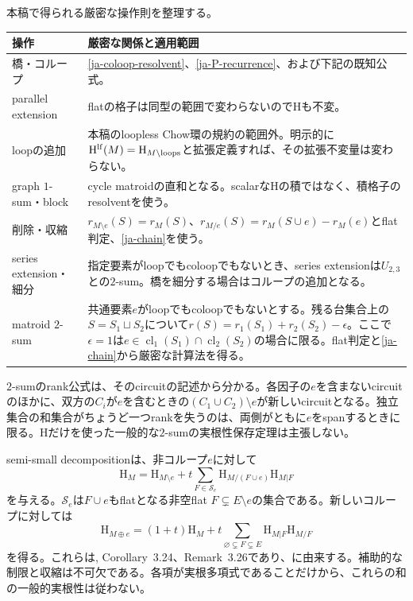 \documentclass[12pt]{amsart}
\theoremstyle{definition}
\theoremstyle{remark}
\numberwithin{equation}{section}
\newcommand{\HCh}{\mathrm{H}}
\newcommand{\clmat}{\operatorname{cl}}
\begin{document}
\begin{samepage}
本稿で得られる厳密な操作則を整理する。
\begin{center}\small
\begin{tabular}{p{3.0cm}p{10.3cm}}
\toprule
操作 & 厳密な関係と適用範囲\\\midrule
橋・コループ & \eqref{ja-coloop-resolvent}、\eqref{ja-P-recurrence}、および下記の既知公式。\\
parallel extension & flatの格子は同型の範囲で変わらないので$\HCh$も不変。\\
loopの追加 & 本稿のloopless Chow環の規約の範囲外。明示的に$\HCh^{\rm lf}(M)=\HCh_{M\setminus\text{loops}}$と拡張定義すれば、その拡張不変量は変わらない。\\
graph $1$-sum・block & cycle matroidの直和となる。scalarな$\HCh$の積ではなく、積格子のresolventを使う。\\
削除・収縮 & $r_{M\setminus e}(S)=r_M(S)$、$r_{M/e}(S)=r_M(S\cup e)-r_M(e)$とflat判定、\eqref{ja-chain}を使う。\\
series extension・細分 & 指定要素がloopでもcoloopでもないとき、series extensionは$U_{2,3}$との$2$-sum。橋を細分する場合はコループの追加となる。\\
matroid $2$-sum & 共通要素$e$がloopでもcoloopでもないとする。残る台集合上の$S=S_1\sqcup S_2$について$r(S)=r_1(S_1)+r_2(S_2)-\epsilon$。ここで$\epsilon=1$は$e\in\clmat_1(S_1)\cap\clmat_2(S_2)$の場合に限る。flat判定と\eqref{ja-chain}から厳密な計算法を得る。\\\bottomrule
\end{tabular}
\end{center}
\end{samepage}
$2$-sumのrank公式は、そのcircuitの記述から分かる。各因子の$e$を含まないcircuitのほかに、双方の$C_i$が$e$を含むときの$(C_1\cup C_2)\setminus e$が新しいcircuitとなる。独立集合の和集合がちょうど一つrankを失うのは、両側がともに$e$をspanするときに限る。$\HCh$だけを使った一般的な$2$-sumの実根性保存定理は主張しない。

semi-small decompositionは、非コループ$e$に対して
\[
 \HCh_M=\HCh_{M\setminus e}
 +t\sum_{F\in\mathcal S_e}\HCh_{M/(F\cup e)}\HCh_{M|F}
\]
を与える。$\mathcal S_e$は$F\cup e$もflatとなる非空flat $F\subsetneq E\setminus e$の集合である。新しいコループに対しては
\[
 \HCh_{M\oplus e}=(1+t)\HCh_M+
 t\sum_{\varnothing\subsetneq F\subsetneq E}\HCh_{M|F}\HCh_{M/F}
\]
を得る。これらは\cite{FMSV24}, Corollary~3.24、Remark~3.26であり、\cite{BHM22}に由来する。補助的な制限と収縮は不可欠である。各項が実根多項式であることだけから、これらの和の一般的実根性は従わない。
\end{document}
